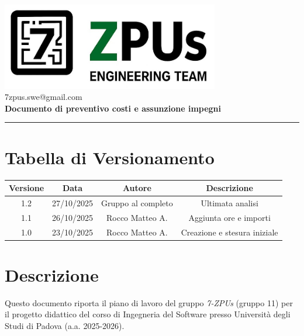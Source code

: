 \documentclass[a4paper,12pt]{article}
\begin{document}
\begin{center}
    \includegraphics[width=9.5cm]{../assets/logo7ZPUs.jpg}\\
    \small\hspace{10cm} 7zpus.swe@gmail.com\\
    \vspace{0.5cm}
    \Large \textbf{Documento di preventivo costi e assunzione impegni}\\
    \vspace{0.2cm}
\end{center}

\vspace{0.3cm}
\hrule
\vspace{0.3cm}

\tableofcontents

\newpage

\section*{Tabella di Versionamento}
    \begin{tabular}{|c|c|c|c|}
        \hline
        \textbf{Versione} & \textbf{Data} & \textbf{Autore} & \textbf{Descrizione} \\
        \hline
        1.2 & 27/10/2025 & Gruppo al completo & Ultimata analisi \\
        \hline
        1.1 & 26/10/2025 & Rocco Matteo A. & Aggiunta ore e importi \\
        \hline
        1.0 & 23/10/2025 & Rocco Matteo A. & Creazione e stesura iniziale \\
        \hline
    \end{tabular}

\section{Descrizione}
Questo documento riporta il piano di lavoro del gruppo \textit{7-ZPUs} (gruppo 11) per il progetto didattico del corso di Ingegneria del Software presso Università degli Studi di Padova (a.a. 2025-2026).
\end{document}
